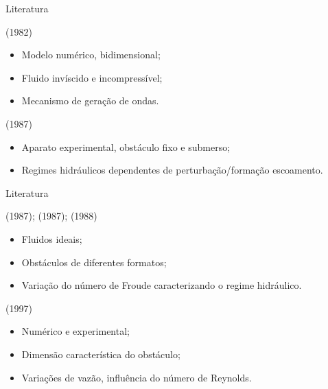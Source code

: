 \begin{frame}{Literatura}
    
    \begin{exampleblock}{ (1982)}
        \begin{itemize}
            \item Modelo numérico, bidimensional;
            \item Fluido invíscido e incompressível;
            \item Mecanismo de geração de ondas.
        \end{itemize}
    \end{exampleblock}

    \begin{exampleblock}{ (1987)}
        \begin{itemize}
            \item Aparato experimental, obstáculo fixo e submerso;
            \item Regimes hidráulicos dependentes de perturbação/formação escoamento.
        \end{itemize}
    \end{exampleblock}

\end{frame}

\begin{frame}{Literatura}
    \begin{exampleblock}{ (1987); 
         (1987);  (1988)}
        \begin{itemize}
            \item Fluidos ideais;
            \item Obstáculos de diferentes formatos;
            \item Variação do número de Froude caracterizando o regime hidráulico.
        \end{itemize}
    \end{exampleblock}

    \begin{exampleblock}{ (1997)}
        \begin{itemize}
            \item Numérico e experimental;
            \item Dimensão característica do obstáculo;
            \item Variações de vazão, influência do número de Reynolds.
        \end{itemize}
    \end{exampleblock}
\end{frame}

